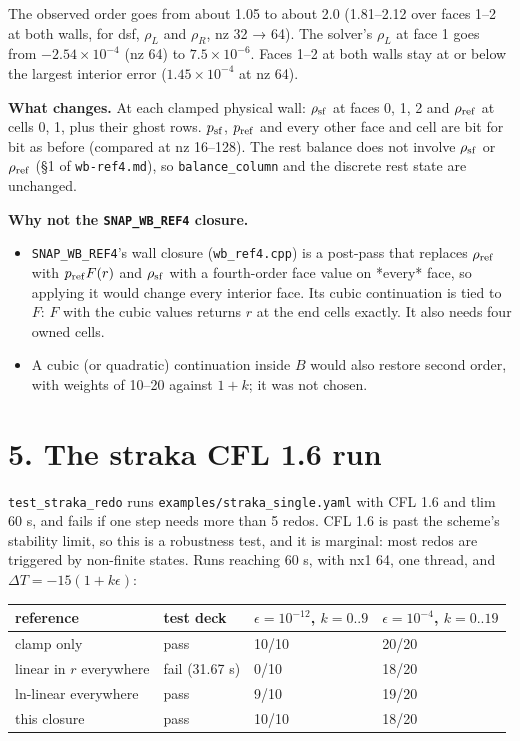 \documentclass[11pt,a4paper]{article}
\begin{document}
The observed order goes from about 1.05 to about 2.0 (1.81–2.12 over faces 1–2 at both walls, for dsf,
$\rho_L$ and $\rho_R$, nz 32 → 64). The solver's $\rho_L$ at face 1 goes from $-2.54\times10^{-4}$ (nz 64) to
$7.5\times10^{-6}$. Faces 1–2 at both walls stay at or below the largest interior error ($1.45\times10^{-4}$ at
nz 64).

\textbf{What changes.} At each clamped physical wall: $\rho_{\rm sf}$ at faces 0, 1, 2 and $\rho_{\rm ref}$ at cells 0, 1,
plus their ghost rows. $p_{\rm sf}$, $p_{\rm ref}$ and every other face and cell are bit for bit as before
(compared at nz 16–128). The rest balance does not involve $\rho_{\rm sf}$ or $\rho_{\rm ref}$ (§1 of
\texttt{wb-ref4.md}), so \texttt{balance\_column} and the discrete rest state are unchanged.

\textbf{Why not the \texttt{SNAP\_WB\_REF4} closure.}
\begin{itemize}
\item \texttt{SNAP\_WB\_REF4}'s wall closure (\texttt{wb\_ref4.cpp}) is a post-pass that replaces $\rho_{\rm ref}$ with
  $p_{\rm ref}F(r)$ and $\rho_{\rm sf}$ with a fourth-order face value on *every* face, so applying it would change
  every interior face. Its cubic continuation is tied to $F$: $F$ with the cubic values returns $r$ at the end
  cells exactly. It also needs four owned cells.
\item A cubic (or quadratic) continuation inside $B$ would also restore second order, with weights of 10–20 against
  $1+k$; it was not chosen.
\end{itemize}

\section*{5. The straka CFL 1.6 run}

\texttt{test\_straka\_redo} runs \texttt{examples/straka\_single.yaml} with CFL 1.6 and tlim 60 s, and fails if one step needs more
than 5 redos. CFL 1.6 is past the scheme's stability limit, so this is a robustness test, and it is marginal: most
redos are triggered by non-finite states. Runs reaching 60 s, with nx1 64, one thread, and
$\Delta T = -15(1 + k\epsilon)$:

\begin{longtable}{llll}
\toprule
reference & test deck & $\epsilon = 10^{-12}$, $k = 0..9$ & $\epsilon = 10^{-4}$, $k = 0..19$ \\
\midrule
clamp only & pass & 10/10 & 20/20 \\
linear in $r$ everywhere & fail (31.67 s) & 0/10 & 18/20 \\
ln-linear everywhere & pass & 9/10 & 19/20 \\
this closure & pass & 10/10 & 18/20 \\
\bottomrule
\end{longtable}
\end{document}
